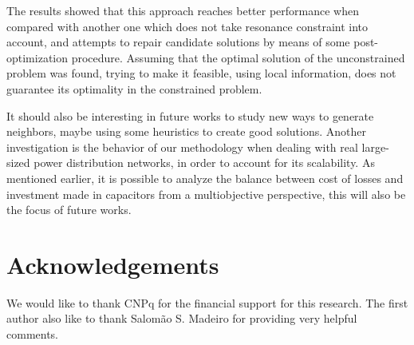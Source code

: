 \documentclass[11pt]{article}
\begin{document}
The results showed that this approach reaches better performance when compared with 
another one which does not take resonance constraint into account, and attempts 
to repair candidate solutions by means of some post-optimization procedure. Assuming that
the optimal solution of the unconstrained problem was found, trying to make it
feasible, using local information, does not guarantee its optimality in the
constrained problem.

It should also be interesting in future works to study new ways to generate neighbors, 
maybe using some heuristics to create good solutions. Another investigation is
the behavior of our methodology when dealing with real large-sized power distribution networks,
in order to account for its scalability. As mentioned earlier, it is possible to analyze
the balance between cost of losses and investment made in capacitors from a multiobjective perspective,
this will also be the focus of future works.

\section{Acknowledgements}

We would like to thank CNPq for the financial support for this research.
The first author also like to thank Salom\~ao S. Madeiro for providing
very helpful comments.



\end{document}
